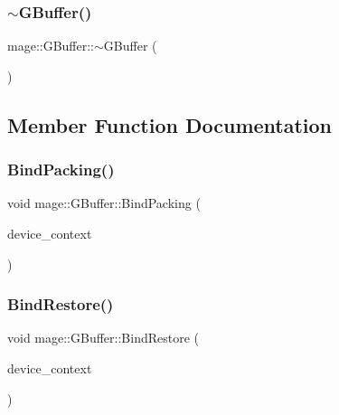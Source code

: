 \hypertarget{structmage_1_1_g_buffer_ace75566b38462d7edd1299379e418318}{}\label{structmage_1_1_g_buffer_ace75566b38462d7edd1299379e418318} 
\subsubsection{\texorpdfstring{$\sim$\+G\+Buffer()}{~GBuffer()}}
{\footnotesize\ttfamily mage\+::\+G\+Buffer\+::$\sim$\+G\+Buffer (\begin{DoxyParamCaption}{ }\end{DoxyParamCaption})\hspace{0.3cm}{\ttfamily [default]}}



\subsection{Member Function Documentation}
\hypertarget{structmage_1_1_g_buffer_a90645118643a60f597741ebb319eb077}{}\label{structmage_1_1_g_buffer_a90645118643a60f597741ebb319eb077} 
\subsubsection{\texorpdfstring{Bind\+Packing()}{BindPacking()}}
{\footnotesize\ttfamily void mage\+::\+G\+Buffer\+::\+Bind\+Packing (\begin{DoxyParamCaption}\item[{I\+D3\+D11\+Device\+Context2 $\ast$}]{device\+\_\+context }\end{DoxyParamCaption})\hspace{0.3cm}{\ttfamily [noexcept]}}

\hypertarget{structmage_1_1_g_buffer_a9d5be00779acac0212fe731cfd4e4fe4}{}\label{structmage_1_1_g_buffer_a9d5be00779acac0212fe731cfd4e4fe4} 
\subsubsection{\texorpdfstring{Bind\+Restore()}{BindRestore()}}
{\footnotesize\ttfamily void mage\+::\+G\+Buffer\+::\+Bind\+Restore (\begin{DoxyParamCaption}\item[{I\+D3\+D11\+Device\+Context2 $\ast$}]{device\+\_\+context }\end{DoxyParamCaption})\hspace{0.3cm}{\ttfamily [noexcept]}}

